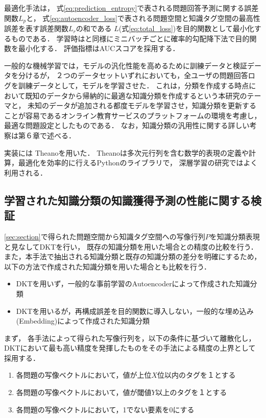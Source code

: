 最適化手法は，
式\ref{eq:prediction_entropy}で表される問題回答予測に関する誤差関数$L_p$と，
式\ref{eq:autoencoder_loss}で表される問題空間と知識タグ空間の最高性誤差を表す誤差関数$L_r$の和である
$L$(式\ref{eq:total_loss})を目的関数として最小化するものである．
学習時は\cite{piech2015deep}と同様にミニバッチごとに確率的勾配降下法で目的関数を最小化する．
評価指標はAUCスコアを採用する．

一般的な機械学習では，モデルの汎化性能を高めるために訓練データと検証データを分けるが，
２つのデータセットいずれにおいても，全ユーザの問題回答ログを訓練データとして，モデルを学習させた．
これは，分類を作成する時点において既知のデータから帰納的に最適な知識分類を作成するという本研究のテーマと，
未知のデータが追加される都度モデルを学習させ，知識分類を更新することが容易であるオンライン教育サービスのプラットフォームの環境を考慮し，
最適な問題設定としたものである．
なお，知識分類の汎用性に関する詳しい考察は第６章で述べる．

実装には
Theanoを用いた\cite{bergstra+al:2010-scipy,Bastien-Theano-2012}．
Theanoは多次元行列を含む数学的表現の定義や計算，最適化を効率的に行えるPythonのライブラリで，
深層学習の研究ではよく利用される．


\subsection{学習された知識分類の知識獲得予測の性能に関する検証}

\ref{sec:section}で得られた問題空間から知識タグ空間への写像行列$P$を知識分類表現と見なしてDKTを行い，
既存の知識分類を用いた場合との精度の比較を行う．
また，本手法で抽出される知識分類と既存の知識分類の差分を明確にするため，
以下の方法で作成された知識分類を用いた場合とも比較を行う．
\begin{itemize}
\item DKTを用いず，一般的な事前学習のAutoencoderによって作成された知識分類 \label{c1}
\item DKTを用いるが，再構成誤差を目的関数に導入しない，一般的な埋め込み(Embedding)によって作成された知識分類 \label{c2}
\end{itemize}

まず，
各手法によって得られた写像行列を，以下の条件に基づいて離散化し，
DKTにおいて最も高い精度を発揮したものをその手法による精度の上界として採用する．
\begin{enumerate}
\item 各問題の写像ベクトルにおいて，値が上位$X$位以内のタグを１とする
\item 各問題の写像ベクトルにおいて，値が閾値$Y$以上のタグを１とする
\item 各問題の写像ベクトルにおいて，1でない要素を0にする
\end{enumerate}


